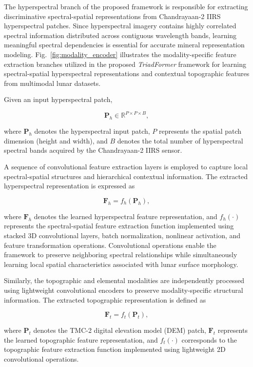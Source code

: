 \documentclass[pdflatex,sn-mathphys-num]{sn-jnl}
\begin{document}
The hyperspectral branch of the proposed framework is responsible for extracting discriminative spectral-spatial representations from Chandrayaan-2 IIRS hyperspectral patches. Since hyperspectral imagery contains highly correlated spectral information distributed across contiguous wavelength bands, learning meaningful spectral dependencies is essential for accurate mineral representation modeling. Fig.~\ref{fig:modality_encoder} illustrates the modality-specific feature extraction branches utilized in the proposed \textit{TriadFormer} framework for learning spectral-spatial hyperspectral representations and contextual topographic features from multimodal lunar datasets.

Given an input hyperspectral patch,

\[
\mathbf{P}_{h} \in \mathbb{R}^{P \times P \times B},
\]

where $\mathbf{P}_{h}$ denotes the hyperspectral input patch, $P$ represents the spatial patch dimension (height and width), and $B$ denotes the total number of hyperspectral spectral bands acquired by the Chandrayaan-2 IIRS sensor.

A sequence of convolutional feature extraction layers is employed to capture local spectral-spatial structures and hierarchical contextual information. The extracted hyperspectral representation is expressed as

\[
\mathbf{F}_{h}=f_{h}(\mathbf{P}_{h}),
\]

where $\mathbf{F}_{h}$ denotes the learned hyperspectral feature representation, and $f_h(\cdot)$ represents the spectral-spatial feature extraction function implemented using stacked 3D convolutional layers, batch normalization, nonlinear activation, and feature transformation operations. Convolutional operations enable the framework to preserve neighboring spectral relationships while simultaneously learning local spatial characteristics associated with lunar surface morphology.

Similarly, the topographic and elemental modalities are independently processed using lightweight convolutional encoders to preserve modality-specific structural information. The extracted topographic representation is defined as

\[
\mathbf{F}_{t}=f_{t}(\mathbf{P}_{t}),
\]

where $\mathbf{P}_{t}$ denotes the TMC-2 digital elevation model (DEM) patch, $\mathbf{F}_{t}$ represents the learned topographic feature representation, and $f_t(\cdot)$ corresponds to the topographic feature extraction function implemented using lightweight 2D convolutional operations.
\end{document}

